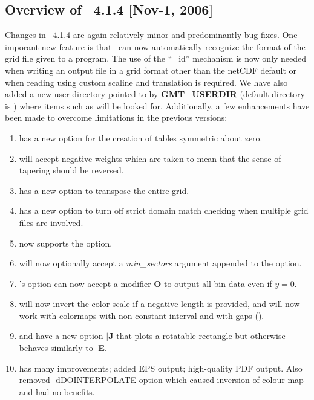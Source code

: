 \subsection{Overview of \gmt\ 4.1.4 [Nov-1, 2006]}

Changes in \GMT\ 4.1.4 are again relatively minor and predominantly bug fixes.  One imporant
new feature is that \GMT\ can now automatically recognize the format of the grid file given
to a program.  The use of the ``=id'' mechanism is now only needed when writing an output file in
a grid format other than the netCDF default or when reading using custom scaline and translation
is required.  We have also added
a new user directory pointed to by \textbf{GMT\_USERDIR} (default directory is )
where items such as  will be looked for.  Additionally, a few enhancements
have been made to overcome limitations in the previous versions:

\begin{enumerate}
\item {} has a new option  for the creation of tables symmetric about zero.
\item {} will accept negative weights which are taken to mean that the sense of tapering should be reversed.
\item {} has a new option  to transpose the entire grid.
\item {} has a new option  to turn off strict domain match checking when multiple grid files are involved.
\item {} now supports the  option.
\item {} will now optionally accept a \emph{min\_sectors} argument appended to the  option.
\item {}'s option  can now accept a modifier \textbf{O} to output all bin data even if $y = 0$.
\item {} will now invert the color scale if a negative length is provided, and
 will now work with colormaps with non-constant interval and with gaps ().
\item {} and  have a new option $|$\textbf{J} that plots a rotatable
rectangle but otherwise behaves similarly to $|$\textbf{E}.
\item {} has many improvements; added EPS output; high-quality PDF output.
Also removed -dDOINTERPOLATE option which caused inversion of colour map and had no benefits.
\end{enumerate}


